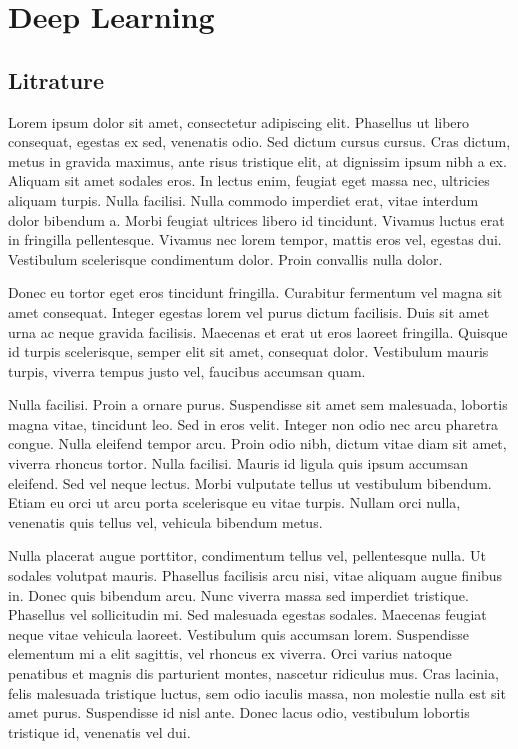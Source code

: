 \chapter{Deep Learning}
\section{Litrature}

Lorem ipsum dolor sit amet, consectetur adipiscing elit. Phasellus ut libero consequat, egestas ex sed, venenatis odio. Sed dictum cursus cursus. Cras dictum, metus in gravida maximus, ante risus tristique elit, at dignissim ipsum nibh a ex. Aliquam sit amet sodales eros. In lectus enim, feugiat eget massa nec, ultricies aliquam turpis. Nulla facilisi. Nulla commodo imperdiet erat, vitae interdum dolor bibendum a. Morbi feugiat ultrices libero id tincidunt. Vivamus luctus erat in fringilla pellentesque. Vivamus nec lorem tempor, mattis eros vel, egestas dui. Vestibulum scelerisque condimentum dolor. Proin convallis nulla dolor.

Donec eu tortor eget eros tincidunt fringilla. Curabitur fermentum vel magna sit amet consequat. Integer egestas lorem vel purus dictum facilisis. Duis sit amet urna ac neque gravida facilisis. Maecenas et erat ut eros laoreet fringilla. Quisque id turpis scelerisque, semper elit sit amet, consequat dolor. Vestibulum mauris turpis, viverra tempus justo vel, faucibus accumsan quam.

Nulla facilisi. Proin a ornare purus. Suspendisse sit amet sem malesuada, lobortis magna vitae, tincidunt leo. Sed in eros velit. Integer non odio nec arcu pharetra congue. Nulla eleifend tempor arcu. Proin odio nibh, dictum vitae diam sit amet, viverra rhoncus tortor. Nulla facilisi. Mauris id ligula quis ipsum accumsan eleifend. Sed vel neque lectus. Morbi vulputate tellus ut vestibulum bibendum. Etiam eu orci ut arcu porta scelerisque eu vitae turpis. Nullam orci nulla, venenatis quis tellus vel, vehicula bibendum metus.

Nulla placerat augue porttitor, condimentum tellus vel, pellentesque nulla. Ut sodales volutpat mauris. Phasellus facilisis arcu nisi, vitae aliquam augue finibus in. Donec quis bibendum arcu. Nunc viverra massa sed imperdiet tristique. Phasellus vel sollicitudin mi. Sed malesuada egestas sodales. Maecenas feugiat neque vitae vehicula laoreet. Vestibulum quis accumsan lorem. Suspendisse elementum mi a elit sagittis, vel rhoncus ex viverra. Orci varius natoque penatibus et magnis dis parturient montes, nascetur ridiculus mus. Cras lacinia, felis malesuada tristique luctus, sem odio iaculis massa, non molestie nulla est sit amet purus. Suspendisse id nisl ante. Donec lacus odio, vestibulum lobortis tristique id, venenatis vel dui.

